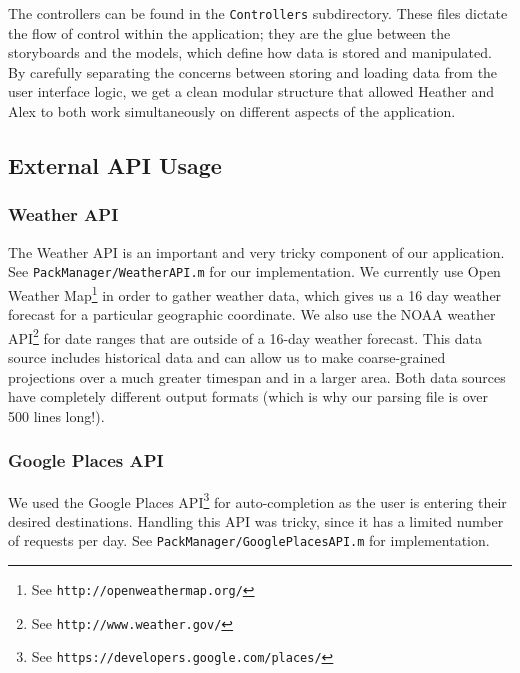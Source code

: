 \documentclass[11pt]{article}
\begin{document}
    The controllers can be found in the \texttt{Controllers} subdirectory. These files dictate the flow of control within the application; they are the glue between the storyboards and the models, which define how data is stored and manipulated. By carefully separating the concerns between storing and loading data from the user interface logic, we get a clean modular structure that allowed Heather and Alex to both work simultaneously on different aspects of the application. 


    \subsection{External API Usage}
    \subsubsection{Weather API}
    The Weather API is an important and very tricky component of our application. See \texttt{PackManager/WeatherAPI.m} for our implementation. We currently use Open Weather Map\footnote{See \texttt{http://openweathermap.org/}} in order to gather weather data, which gives us a 16 day weather forecast for a particular geographic coordinate. We also use the NOAA weather API\footnote{See \texttt{http://www.weather.gov/}} for date ranges that are outside of a 16-day weather forecast. This data source includes historical data and can allow us to make coarse-grained projections over a much greater timespan and in a larger area. Both data sources have completely different output formats (which is why our parsing file is over 500 lines long!).

    \subsubsection{Google Places API}
    We used the Google Places API\footnote{See \texttt{https://developers.google.com/places/}} for auto-completion as the user is entering their desired destinations. Handling this API was tricky, since it has a limited number of requests per day. See \texttt{PackManager/GooglePlacesAPI.m} for implementation.

\end{document}
